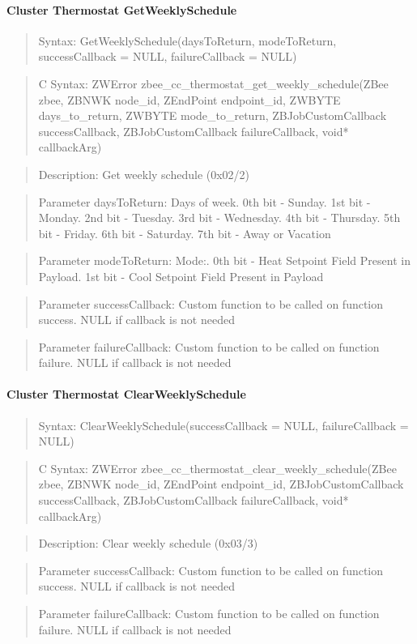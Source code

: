 \paragraph{Cluster Thermostat GetWeeklySchedule}
\begin{quote}Syntax: GetWeeklySchedule(daysToReturn, modeToReturn, successCallback = NULL, failureCallback = NULL)\end{quote}
\begin{quote}C Syntax: ZWError zbee\_cc\_thermostat\_get\_weekly\_schedule(ZBee zbee, ZBNWK node\_id, ZEndPoint endpoint\_id, ZWBYTE days\_to\_return, ZWBYTE mode\_to\_return, ZBJobCustomCallback successCallback, ZBJobCustomCallback failureCallback, void* callbackArg)\end{quote}
\begin{quote}Description: Get weekly schedule (0x02/2)\end{quote}
\begin{quote}Parameter daysToReturn: Days of week. 0th bit - Sunday. 1st bit - Monday. 2nd bit - Tuesday. 3rd bit - Wednesday. 4th bit - Thursday. 5th bit - Friday. 6th bit - Saturday. 7th bit - Away or Vacation\end{quote}
\begin{quote}Parameter modeToReturn: Mode:. 0th bit - Heat Setpoint Field Present in Payload. 1st bit - Cool Setpoint Field Present in Payload\end{quote}
\begin{quote}Parameter successCallback: Custom function to be called on function success. NULL if callback is not needed\end{quote}
\begin{quote}Parameter failureCallback: Custom function to be called on function failure. NULL if callback is not needed\end{quote}


\paragraph{Cluster Thermostat ClearWeeklySchedule}
\begin{quote}Syntax: ClearWeeklySchedule(successCallback = NULL, failureCallback = NULL)\end{quote}
\begin{quote}C Syntax: ZWError zbee\_cc\_thermostat\_clear\_weekly\_schedule(ZBee zbee, ZBNWK node\_id, ZEndPoint endpoint\_id, ZBJobCustomCallback successCallback, ZBJobCustomCallback failureCallback, void* callbackArg)\end{quote}
\begin{quote}Description: Clear weekly schedule (0x03/3)\end{quote}
\begin{quote}Parameter successCallback: Custom function to be called on function success. NULL if callback is not needed\end{quote}
\begin{quote}Parameter failureCallback: Custom function to be called on function failure. NULL if callback is not needed\end{quote}


